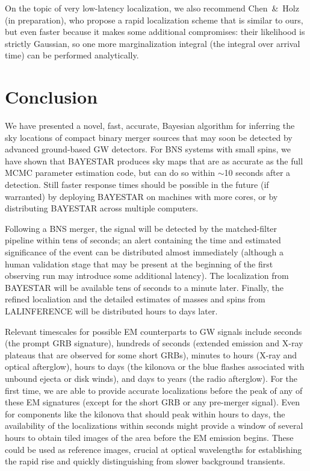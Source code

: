 \documentclass[amsmath,amssymb,aps,prx,reprint,nopreprintnumbers,nofootinbib,showpacs]{revtex4-1}
\begin{document}
On the topic of very low\nobreakdashes-latency localization, we also recommend Chen~\&~Holz (in preparation), who propose a rapid localization scheme that is similar to ours, but even faster because it makes some additional compromises: their likelihood is strictly Gaussian, so one more marginalization integral (the integral over arrival time) can be performed analytically.

\section{Conclusion}

We have presented a novel, fast, accurate, Bayesian algorithm for inferring the sky locations of compact binary merger sources that may soon be detected by advanced ground\nobreakdashes-based \ac{GW} detectors. For \ac{BNS} systems with small spins, we have shown that \ac{BAYESTAR} produces sky maps that are as accurate as the full \ac{MCMC} parameter estimation code, but can do so within $\sim$10 seconds after a detection. Still faster response times should be possible in the future (if warranted) by deploying \ac{BAYESTAR} on machines with more cores, or by distributing \ac{BAYESTAR} across multiple computers.

Following a \ac{BNS} merger, the signal will be detected by the matched\nobreakdashes-filter pipeline within tens of seconds; an alert containing the time and estimated significance of the event can be distributed almost immediately (although a human validation stage that may be present at the beginning of the first observing run may introduce some additional latency). The localization from \ac{BAYESTAR} will be available tens of seconds to a minute later. Finally, the refined localiation and the detailed estimates of masses and spins from LALINFERENCE will be distributed hours to days later.

Relevant timescales for possible \ac{EM} counterparts to \ac{GW} signals include seconds (the prompt \ac{GRB} signature), hundreds of seconds (extended emission and X\nobreakdashes-ray plateaus that are observed for some short \acp{GRB}), minutes to hours (X\nobreakdashes-ray and optical afterglow), hours to days (the kilonova or the blue flashes associated with unbound ejecta or disk winds), and days to years (the radio afterglow). For the first time, we are able to provide accurate localizations before the peak of any of these \ac{EM} signatures (except for the short \ac{GRB} or any pre\nobreakdashes-merger signal). Even for components like the kilonova that should peak within hours to days, the availability of the localizations within seconds might provide a window of several hours to obtain tiled images of the area before the \ac{EM} emission begins. These could be used as reference images, crucial at optical wavelengths for establishing the rapid rise and quickly distinguishing from slower background transients.
\end{document}
